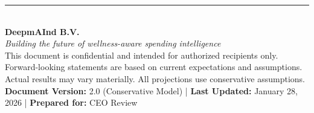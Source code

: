 \documentclass[11pt,a4paper]{article}
\begin{document}
\vspace{30pt}

\begin{center}
\rule{0.6\textwidth}{0.5pt}\\[20pt]
{\Large\textbf{\textcolor{miloprimary}{DeepmAInd B.V.}}}\\[10pt]
{\itshape Building the future of wellness-aware spending intelligence}\\[30pt]

{\footnotesize\color{milogray}
This document is confidential and intended for authorized recipients only.\\
Forward-looking statements are based on current expectations and assumptions.\\
Actual results may vary materially. All projections use conservative assumptions.\\[15pt]
\textbf{Document Version:} 2.0 (Conservative Model) | \textbf{Last Updated:} January 28, 2026 | \textbf{Prepared for:} CEO Review
}
\end{center}
\end{document}
